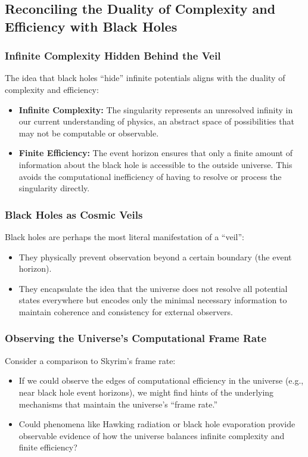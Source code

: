 \documentclass[12pt]{article}
\begin{document}
\subsection{Reconciling the Duality of Complexity and Efficiency with Black Holes}

\subsubsection{Infinite Complexity Hidden Behind the Veil}

The idea that black holes ``hide'' infinite potentials aligns with the duality of complexity and efficiency:
\begin{itemize}
    \item \textbf{Infinite Complexity:} The singularity represents an unresolved infinity in our current understanding of physics, an abstract space of possibilities that may not be computable or observable.
    \item \textbf{Finite Efficiency:} The event horizon ensures that only a finite amount of information about the black hole is accessible to the outside universe. This avoids the computational inefficiency of having to resolve or process the singularity directly.
\end{itemize}

\subsubsection{Black Holes as Cosmic Veils}

Black holes are perhaps the most literal manifestation of a ``veil'':
\begin{itemize}
    \item They physically prevent observation beyond a certain boundary (the event horizon).
    \item They encapsulate the idea that the universe does not resolve all potential states everywhere but encodes only the minimal necessary information to maintain coherence and consistency for external observers.
\end{itemize}

\subsubsection{Observing the Universe’s Computational Frame Rate}

Consider a comparison to Skyrim's frame rate:
\begin{itemize}
    \item If we could observe the edges of computational efficiency in the universe (e.g., near black hole event horizons), we might find hints of the underlying mechanisms that maintain the universe's ``frame rate.''
    \item Could phenomena like Hawking radiation or black hole evaporation provide observable evidence of how the universe balances infinite complexity and finite efficiency?
\end{itemize}
\end{document}
